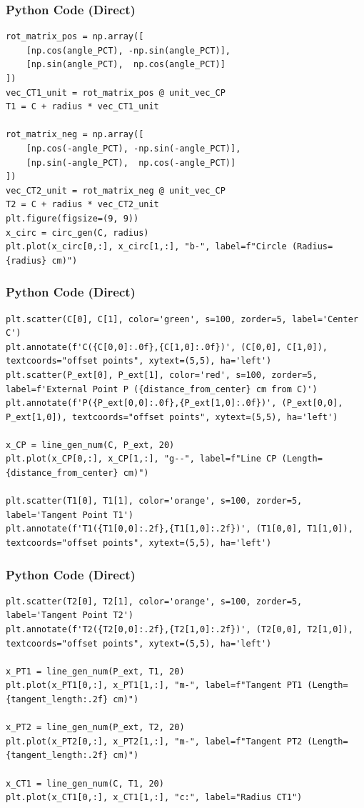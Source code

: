 \documentclass{beamer}
\begin{document}
\begin{frame}[fragile]
\frametitle{Python Code (Direct)}
\begin{lstlisting}
rot_matrix_pos = np.array([
    [np.cos(angle_PCT), -np.sin(angle_PCT)],
    [np.sin(angle_PCT),  np.cos(angle_PCT)]
])
vec_CT1_unit = rot_matrix_pos @ unit_vec_CP
T1 = C + radius * vec_CT1_unit

rot_matrix_neg = np.array([
    [np.cos(-angle_PCT), -np.sin(-angle_PCT)],
    [np.sin(-angle_PCT),  np.cos(-angle_PCT)]
])
vec_CT2_unit = rot_matrix_neg @ unit_vec_CP
T2 = C + radius * vec_CT2_unit
plt.figure(figsize=(9, 9))
x_circ = circ_gen(C, radius)
plt.plot(x_circ[0,:], x_circ[1,:], "b-", label=f"Circle (Radius={radius} cm)")
\end{lstlisting}
\end{frame}

\begin{frame}[fragile]
\frametitle{Python Code (Direct)}
\begin{lstlisting}
plt.scatter(C[0], C[1], color='green', s=100, zorder=5, label='Center C')
plt.annotate(f'C({C[0,0]:.0f},{C[1,0]:.0f})', (C[0,0], C[1,0]), textcoords="offset points", xytext=(5,5), ha='left')
plt.scatter(P_ext[0], P_ext[1], color='red', s=100, zorder=5, label=f'External Point P ({distance_from_center} cm from C)')
plt.annotate(f'P({P_ext[0,0]:.0f},{P_ext[1,0]:.0f})', (P_ext[0,0], P_ext[1,0]), textcoords="offset points", xytext=(5,5), ha='left')

x_CP = line_gen_num(C, P_ext, 20)
plt.plot(x_CP[0,:], x_CP[1,:], "g--", label=f"Line CP (Length={distance_from_center} cm)")

plt.scatter(T1[0], T1[1], color='orange', s=100, zorder=5, label='Tangent Point T1')
plt.annotate(f'T1({T1[0,0]:.2f},{T1[1,0]:.2f})', (T1[0,0], T1[1,0]), textcoords="offset points", xytext=(5,5), ha='left')
\end{lstlisting}
\end{frame}

\begin{frame}[fragile]
\frametitle{Python Code (Direct)}
\begin{lstlisting}
plt.scatter(T2[0], T2[1], color='orange', s=100, zorder=5, label='Tangent Point T2')
plt.annotate(f'T2({T2[0,0]:.2f},{T2[1,0]:.2f})', (T2[0,0], T2[1,0]), textcoords="offset points", xytext=(5,5), ha='left')

x_PT1 = line_gen_num(P_ext, T1, 20)
plt.plot(x_PT1[0,:], x_PT1[1,:], "m-", label=f"Tangent PT1 (Length={tangent_length:.2f} cm)")

x_PT2 = line_gen_num(P_ext, T2, 20)
plt.plot(x_PT2[0,:], x_PT2[1,:], "m-", label=f"Tangent PT2 (Length={tangent_length:.2f} cm)")

x_CT1 = line_gen_num(C, T1, 20)
plt.plot(x_CT1[0,:], x_CT1[1,:], "c:", label="Radius CT1")
\end{lstlisting}
\end{frame}
\end{document}
